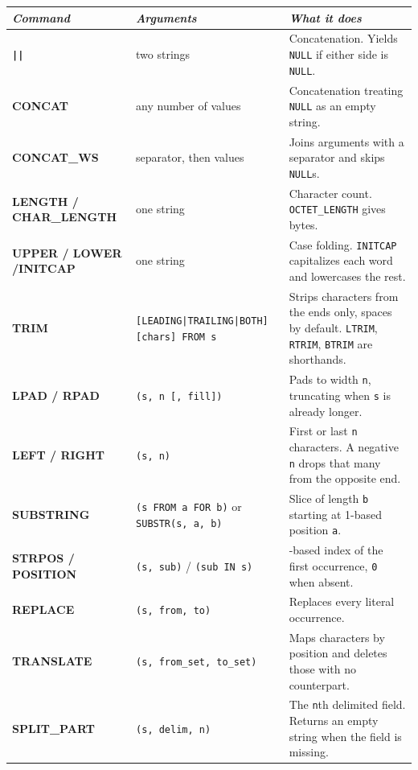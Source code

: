 \begin{table}[H]
\centering
\footnotesize
\renewcommand{\arraystretch}{1.4}
\begin{tabularx}{\textwidth}{>{\raggedright\arraybackslash}p{} >{\raggedright\arraybackslash}p{} >{\raggedright\arraybackslash}X}
\toprule
\textit{Command} & \textit{Arguments} & \textit{What it does} \\
\midrule
\textbf{\texttt{||}} & two strings & Concatenation. Yields \texttt{NULL} if either side is \texttt{NULL}. \\
\textbf{CONCAT} & any number of values & Concatenation treating \texttt{NULL} as an empty string. \\
\textbf{CONCAT\_WS} & separator, then values & Joins arguments with a separator and skips \texttt{NULL}s. \\
\textbf{LENGTH / CHAR\_LENGTH} & one string & Character count. \texttt{OCTET\_LENGTH} gives bytes. \\
\textbf{UPPER / LOWER /\allowbreak INITCAP} & one string & Case folding. \texttt{INITCAP} capitalizes each word and lowercases the rest. \\
\textbf{TRIM} & \texttt{[LEADING|TRAILING|BOTH] [chars] FROM s} & Strips characters from the ends only, spaces by default. \texttt{LTRIM}, \texttt{RTRIM}, \texttt{BTRIM} are shorthands. \\
\textbf{LPAD / RPAD} & \texttt{(s, n [, fill])} & Pads to width \texttt{n}, truncating when \texttt{s} is already longer. \\
\textbf{LEFT / RIGHT} & \texttt{(s, n)} & First or last \texttt{n} characters. A negative \texttt{n} drops that many from the opposite end. \\
\textbf{SUBSTRING} & \texttt{(s FROM a FOR b)} or \texttt{SUBSTR(s, a, b)} & Slice of length \texttt{b} starting at 1-based position \texttt{a}. \\
\textbf{STRPOS / POSITION} & \texttt{(s, sub)} / \texttt{(sub IN s)} & 1-based index of the first occurrence, \texttt{0} when absent. \\
\textbf{REPLACE} & \texttt{(s, from, to)} & Replaces every literal occurrence. \\
\textbf{TRANSLATE} & \texttt{(s, from\_set, to\_set)} & Maps characters by position and deletes those with no counterpart. \\
\textbf{SPLIT\_PART} & \texttt{(s, delim, n)} & The \texttt{n}th delimited field. Returns an empty string when the field is missing. \\

\end{tabularx}
\end{table}
